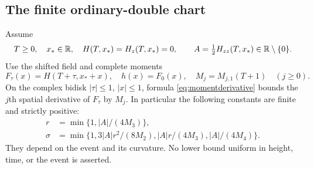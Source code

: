 \subsection{The finite ordinary-double chart}
Assume
\begin{equation}\label{eq:event}
 T\geq0,\quad x_*\in\mathbb R,\quad
 H(T,x_*)=H_z(T,x_*)=0,\qquad
 A=\tfrac12H_{zz}(T,x_*)\in\mathbb R\setminus\{0\}.
\end{equation}
Use the shifted field and complete moments
\begin{equation}\label{eq:shiftedfield}
 F_\tau(x)=H(T+\tau,x_*+x),\quad h(x)=F_0(x),\quad
 M_j=M_{j,1}(T+1)\quad(j\geq0).
\end{equation}
On the complex bidisk $|\tau|\leq1$, $|x|\leq1$, formula
\eqref{eq:momentderivative} bounds the $j$th spatial derivative of
$F_\tau$ by $M_j$. In particular the following constants are finite
and strictly positive:
\begin{align}
 r&=\min\{1,|A|/(4M_3)\},\label{eq:radius}\\
 \sigma&=\min\{1,3|A|r^2/(8M_2),|A|r/(4M_3),|A|/(4M_4)\}.
 \label{eq:timewindow}
\end{align}
They depend on the event and its curvature. No lower bound uniform in
height, time, or the event is asserted.

